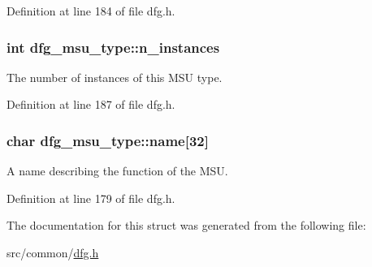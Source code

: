 Definition at line 184 of file dfg.\-h.

\hypertarget{structdfg__msu__type_ae98668b711040cd8cb5d537bb9a3f0cd}{
\subsubsection[{n\-\_\-instances}]{\setlength{\rightskip}{0pt plus 5cm}int dfg\-\_\-msu\-\_\-type\-::n\-\_\-instances}}\label{structdfg__msu__type_ae98668b711040cd8cb5d537bb9a3f0cd}


The number of instances of this M\-S\-U type. 



Definition at line 187 of file dfg.\-h.

\hypertarget{structdfg__msu__type_a59f34013c4d7464817de4fd3c9bebec9}{
\subsubsection[{name}]{\setlength{\rightskip}{0pt plus 5cm}char dfg\-\_\-msu\-\_\-type\-::name\mbox{[}32\mbox{]}}}\label{structdfg__msu__type_a59f34013c4d7464817de4fd3c9bebec9}


A name describing the function of the M\-S\-U. 



Definition at line 179 of file dfg.\-h.



The documentation for this struct was generated from the following file\-:\begin{DoxyCompactItemize}
\item 
src/common/\hyperlink{dfg_8h}{dfg.\-h}\end{DoxyCompactItemize}
